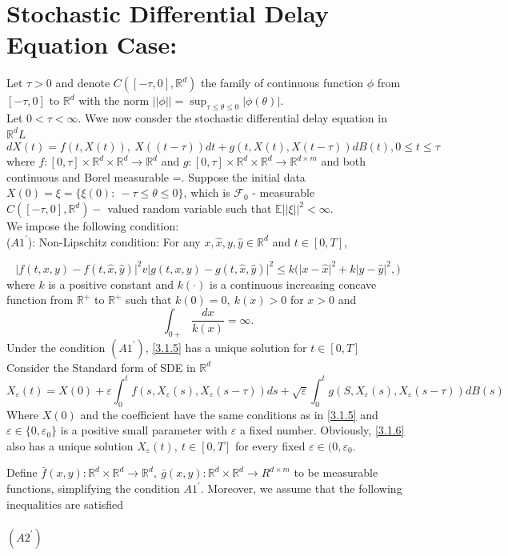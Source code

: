 \documentclass[a4 paper, 12pt]{report}
\theoremstyle{plain}
\begin{document}
\section{Stochastic Differential Delay Equation Case:}
Let $\tau>0$ and denote $C([-\tau,0],\mathbb{R}^d)$ the family of continuous function $\phi$ from $[-\tau,0]$ to $\mathbb{R}^d$ with the norm $||\phi|| = \sup_{\tau\leq \theta\leq 0}|\phi(\theta)|$.\\
Let $0<\tau<\infty$. Wwe now consder the stochastic differential delay equation in $\mathbb{R}^dL$
\begin{equation}\label{3.1.5}
dX(t) = f(t,X(t)),~X((t-\tau))dt+g(t,X(t), X(t-\tau))dB(t), 0\leq t\leq \tau
\end{equation}
where $f:[0,\tau]\times \mathbb{R}^d\times\mathbb{R}^d\rightarrow \mathbb{R}^d$ and $g:[0,\tau]\times\mathbb{R}^d\times \mathbb{R}^d\rightarrow \mathbb{R}^{d\times m}$ and both continuous and Borel measurable =. Suppose the initial data $X(0) = \xi = \{\xi(0):~-\tau\leq \theta\leq 0\}$, which is $\mathcal{F}_0$ - measurable $C([-\tau,0],\mathbb{R}^d) -$ valued random variable such that $\mathbb{E}||\xi||^2<\infty$.\\
We impose the following condition:\\
($A1^\prime$): Non-Lipschitz condition: For any $x,\hat{x},y,\hat{y}\in\mathbb{R}^d$ and $t\in[0,T]$,

$$
\bigg|f(t,x,y) - f(t,\hat{x},\hat{y})\bigg|^2v\bigg|g(t,x,y) - g(t,\hat{x},\hat{y})\bigg|^2\leq k\bigg(\bigg|x-\hat{x}\bigg|^2+k\bigg|y-\hat{y}\bigg|^2,\bigg)
$$
where $k$ is a positive constant and $k(\cdot)$ is a continuous increasing concave function from $\mathbb{R}^+$ to $\mathbb{R}^+$ such that $k(0) = 0, ~k(x)>0$ for $x>0$ and 
$$
\int_{0+}\frac{dx}{k(x)} = \infty.
$$
Under the condition $(A1^\prime)$, \eqref{3.1.5} has a unique solution for $t\in[0,T]$\\
Consider the Standard form of SDE in $\mathbb{R}^d$
\begin{equation}\label{3.1.6}
X_\varepsilon(t) = X(0)+\varepsilon\int_0^tf(s,X_\varepsilon(s),X_\varepsilon(s-\tau))ds+\sqrt{\varepsilon}\int_0^tg(S,X_\varepsilon(s),X_\varepsilon(s-\tau))dB(s)
\end{equation}
Where $X(0)$ and the coefficient have the same conditions as in \eqref{3.1.5} and $\varepsilon\in\{0,\varepsilon_0\}$ is a positive small parameter with $\varepsilon$ a fixed number. Obviously, \eqref{3.1.6} also has a unique solution $X_\varepsilon(t),~t\in[0,T]$ for every fixed $\varepsilon\in(0,\varepsilon_0$.\\
\par Define $\bar{f}(x,y):\mathbb{R}^d\times \mathbb{R}^d\rightarrow \mathbb{R}^d,~\bar{g}(x,y):\mathbb{R}^d\times\mathbb{R}^d\rightarrow R^{d\times m}$ to be measurable functions, simplifying the condition $A1^\prime$. Moreover, we assume that the following inequalities are satisfied\\\\
$(A2^\prime)$
\end{document}
